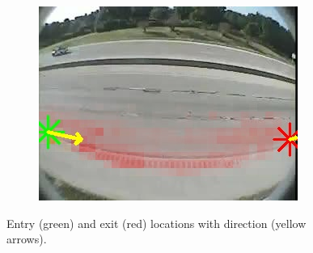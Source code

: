 \begin{figure}
        \begin{subfigure}{0.32\linewidth}
            \includegraphics[width=\linewidth]{./img/scene_learning/res/252707/252707-2.jpg}
        \end{subfigure}
        \caption{Entry (green) and exit (red) locations with direction (yellow arrows).}
        \label{fig:entry-exit-app-4}
\end{figure}
